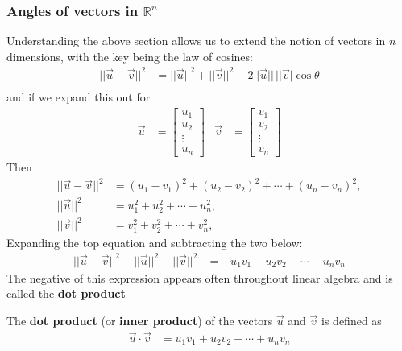 \subsubsection{Angles of vectors in $\mathbb{R}^n$}

\label{subsect:angles:vectors}

Understanding the above section allows us to extend the notion of vectors in $n$ dimensions, with the key being the law of cosines:
\begin{align*}
||\vec{u}-\vec{v}||^2 & = ||\vec{u}||^2 + || \vec{v}||^2 -2 ||\vec{u}|| \,  ||\vec{v}| \cos \theta \\
\end{align*}
and if we expand this out for 
%
\begin{align*}
\vec{u} & = \begin{bmatrix}
u_1 \\ u_2 \\ \vdots \\ u_n 
\end{bmatrix} & 
\vec{v} & = \begin{bmatrix}
v_1 \\ v_2 \\ \vdots \\ v_n 
\end{bmatrix} 
\end{align*}
Then 
%
\begin{align*}
||\vec{u}-\vec{v}||^2 & = (u_1-v_1)^2 + (u_2-v_2)^2 + \cdots + (u_n -v_n)^2, \\
||\vec{u}||^2 & = u_1^2 + u_2^2 + \cdots + u_n^2, \\
||\vec{v}||^2 & = v_1^2 + v_2^2 + \cdots + v_n^2, 
\end{align*}
Expanding the top equation and subtracting the two below:
%
\begin{align*}
||\vec{u}-\vec{v}||^2-||\vec{u}||^2-||\vec{v}||^2 & = -u_1v_1 - u_2v_2 - \cdots -u_nv_n 
\end{align*}
The negative of this expression appears often throughout linear algebra and is called the \textbf{dot product}

\begin{definition}
The \textbf{dot product} (or \textbf{inner product}) of the vectors $\vec{u}$ and $\vec{v}$ is defined as 
%
\begin{align*}
\vec{u} \cdot \vec{v} & = u_1v_1 + u_2v_2 + \cdots +u_nv_n 
\end{align*}
\end{definition}

